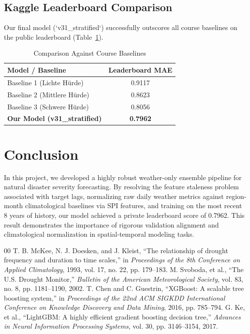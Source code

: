 \documentclass[conference]{IEEEtran}
\begin{document}
\subsection{Kaggle Leaderboard Comparison}
Our final model (`v31\_stratified`) successfully outscores all course baselines on the public leaderboard (Table~\ref{tab:leaderboard}).

\begin{table}[htbp]
\caption{Comparison Against Course Baselines}
\begin{center}
\begin{tabular}{lc}
\toprule
\textbf{Model / Baseline} & \textbf{Leaderboard MAE} \\
\midrule
Baseline 1 (Lichte Hürde) & 0.9117 \\
Baseline 2 (Mittlere Hürde) & 0.8623 \\
Baseline 3 (Schwere Hürde) & 0.8056 \\
\textbf{Our Model (v31\_stratified)} & \textbf{0.7962} \\
\bottomrule
\end{tabular}
\label{tab:leaderboard}
\end{center}
\end{table}

\section{Conclusion}
In this project, we developed a highly robust weather-only ensemble pipeline for natural disaster severity forecasting. By resolving the feature staleness problem associated with target lags, normalizing raw daily weather metrics against region-month climatological baselines via SPI features, and training on the most recent 8 years of history, our model achieved a private leaderboard score of 0.7962. This result demonstrates the importance of rigorous validation alignment and climatological normalization in spatial-temporal modeling tasks.

\begin{thebibliography}{00}
 T. B. McKee, N. J. Doesken, and J. Kleist, ``The relationship of drought frequency and duration to time scales,'' in \textit{Proceedings of the 8th Conference on Applied Climatology}, 1993, vol. 17, no. 22, pp. 179--183.
 M. Svoboda, et al., ``The U.S. Drought Monitor,'' \textit{Bulletin of the American Meteorological Society}, vol. 83, no. 8, pp. 1181--1190, 2002.
 T. Chen and C. Guestrin, ``XGBoost: A scalable tree boosting system,'' in \textit{Proceedings of the 22nd ACM SIGKDD International Conference on Knowledge Discovery and Data Mining}, 2016, pp. 785--794.
 G. Ke, et al., ``LightGBM: A highly efficient gradient boosting decision tree,'' \textit{Advances in Neural Information Processing Systems}, vol. 30, pp. 3146--3154, 2017.
\end{thebibliography}
\end{document}
